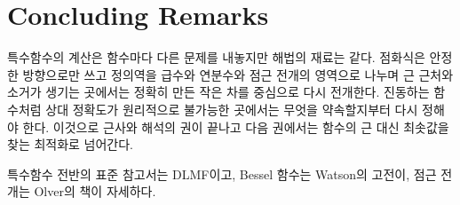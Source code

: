 \section{Concluding Remarks}

특수함수의 계산은 함수마다 다른 문제를 내놓지만 해법의 재료는 같다. 점화식은 안정한 방향으로만 쓰고 정의역을 급수와 연분수와 점근 전개의 영역으로 나누며 근 근처와 소거가 생기는 곳에서는 정확히 만든 작은 차를 중심으로 다시 전개한다. 진동하는 함수처럼 상대 정확도가 원리적으로 불가능한 곳에서는 무엇을 약속할지부터 다시 정해야 한다. 이것으로 근사와 해석의 권이 끝나고 다음 권에서는 함수의 근 대신 최솟값을 찾는 최적화로 넘어간다.

특수함수 전반의 표준 참고서는 DLMF\cite{dlmf}이고, Bessel 함수는 Watson의 고전\cite{watson1944bessel}이, 점근 전개는 Olver의 책\cite{olver1974asymptotics}이 자세하다.

\chapterreferences
